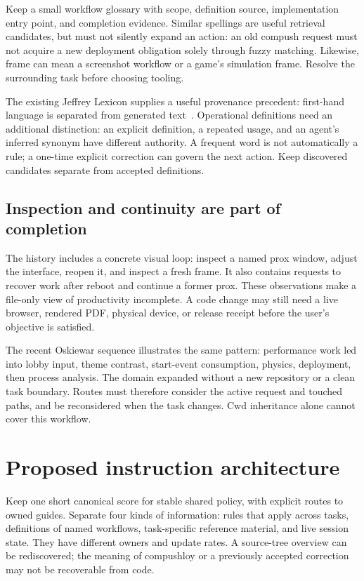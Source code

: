 \documentclass[10pt,letterpaper,twocolumn]{article}
\begin{document}
Keep a small workflow glossary with scope, definition source, implementation entry point, and completion evidence. Similar spellings are useful retrieval candidates, but must not silently expand an action: an old compush request must not acquire a new deployment obligation solely through fuzzy matching. Likewise, frame can mean a screenshot workflow or a game's simulation frame. Resolve the surrounding task before choosing tooling.

The existing Jeffrey Lexicon supplies a useful provenance precedent: first-hand language is separated from generated text~\cite{lexicon}. Operational definitions need an additional distinction: an explicit definition, a repeated usage, and an agent's inferred synonym have different authority. A frequent word is not automatically a rule; a one-time explicit correction can govern the next action. Keep discovered candidates separate from accepted definitions.

\subsection{Inspection and continuity are part of completion}
The history includes a concrete visual loop: inspect a named prox window, adjust the interface, reopen it, and inspect a fresh frame. It also contains requests to recover work after reboot and continue a former prox. These observations make a file-only view of productivity incomplete. A code change may still need a live browser, rendered PDF, physical device, or release receipt before the user's objective is satisfied.

The recent Oskiewar sequence illustrates the same pattern: performance work led into lobby input, theme contrast, start-event consumption, physics, deployment, then process analysis. The domain expanded without a new repository or a clean task boundary. Routes must therefore consider the active request and touched paths, and be reconsidered when the task changes. Cwd inheritance alone cannot cover this workflow.

\section{Proposed instruction architecture}
Keep one short canonical score for stable shared policy, with explicit routes to owned guides. Separate four kinds of information: rules that apply across tasks, definitions of named workflows, task-specific reference material, and live session state. They have different owners and update rates. A source-tree overview can be rediscovered; the meaning of compushloy or a previously accepted correction may not be recoverable from code.
\end{document}
